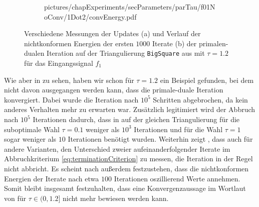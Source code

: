 \begin{figure}[p]
\begin{subfigure}[b]{.47\linewidth}
      {pictures/chapExperiments/secParameters/parTau/f01NoConv/1Dot2/convEnergy.pdf}
    \label{fig:parTauNoConvergenceEnergy}
  \end{subfigure}
  \caption{Verschiedene Messungen der Updates (a) und Verlauf der nichtkonformen
    Energien der ersten $1000$ Iterate (b) der primalen-dualen Iteration auf
    der Triangulierung \texttt{BigSquare} aus  mit
    $\tau=1.2$ für das Eingangssignal $f_1$}
  \label{fig:parTauNoConvergence}
\end{figure}
Wie aber in  zu sehen, haben wir schon für
$\tau=1.2$ ein Beispiel gefunden, bei dem nicht davon ausgegangen werden kann,
dass die primale-duale Iteration konvergiert.
Dabei wurde die Iteration nach $10^5$ Schritten abgebrochen, da kein anderes
Verhalten mehr zu erwarten war.
Zusätzlich legitimiert wird der Abbruch nach $10^5$ Iterationen dadurch, dass
in  auf der gleichen Triangulierung für die
suboptimale Wahl $\tau = 0.1$ weniger als $10^3$ Iterationen und für die Wahl
$\tau=1$ sogar weniger als $10$ Iterationen benötigt wurden.
Weiterhin zeigt , dass auch für andere
Varianten, den Unterschied zweier aufeinanderfolgender Iterate im
Abbruchkriterium \eqref{eq:terminationCriterion} zu messen, die Iteration in
der Regel nicht abbricht.
Es scheint nach  außerdem festzustehen,
dass die nichtkonformen Energien der Iterate nach etwa $100$ Iterationen
oszillierend Werte annehmen.
Somit bleibt insgesamt festzuhalten, dass eine Konvergenzaussage im Wortlaut
von  für $\tau\in(0,1.2]$ nicht mehr bewiesen
werden kann.

